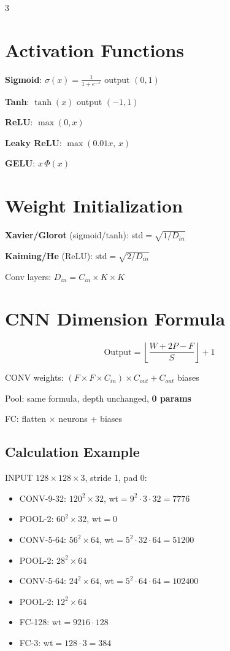 \documentclass[6pt,landscape,a4paper]{extarticle}
\begin{document}
\begin{multicols}{3}
\section{Activation Functions}

\textbf{Sigmoid}: $\sigma(x)=\frac{1}{1+e^{-x}}$ \quad output $(0,1)$

\textbf{Tanh}: $\tanh(x)$ \quad output $(-1,1)$

\textbf{ReLU}: $\max(0,x)$

\textbf{Leaky ReLU}: $\max(0.01x,\, x)$

\textbf{GELU}: $x\,\Phi(x)$

\section{Weight Initialization}

\textbf{Xavier/Glorot} (sigmoid/tanh): $\text{std} = \sqrt{1/D_{in}}$

\textbf{Kaiming/He} (ReLU): $\text{std} = \sqrt{2/D_{in}}$

Conv layers: $D_{in} = C_{in} \times K \times K$

\section{CNN Dimension Formula}

\[\boxed{\text{Output} = \left\lfloor\frac{W + 2P - F}{S}\right\rfloor + 1}\]

CONV weights: $(F \!\times\! F \!\times\! C_{in}) \times C_{out} + C_{out}$ biases

Pool: same formula, depth unchanged, \textbf{0 params}

FC: flatten $\times$ neurons + biases

\subsection{Calculation Example}
INPUT $128\!\times\!128\!\times\!3$, stride 1, pad 0:
\begin{itemize}[nosep,leftmargin=*]
\item CONV-9-32: $120^2\!\times\!32$, wt$=9^2\!\cdot\!3\!\cdot\!32\!=\!7776$
\item POOL-2: $60^2\!\times\!32$, wt$=0$
\item CONV-5-64: $56^2\!\times\!64$, wt$=5^2\!\cdot\!32\!\cdot\!64\!=\!51200$
\item POOL-2: $28^2\!\times\!64$
\item CONV-5-64: $24^2\!\times\!64$, wt$=5^2\!\cdot\!64\!\cdot\!64\!=\!102400$
\item POOL-2: $12^2\!\times\!64$
\item FC-128: wt$=9216\!\cdot\!128$
\item FC-3: wt$=128\!\cdot\!3\!=\!384$
\end{itemize}


\end{multicols}
\end{document}
